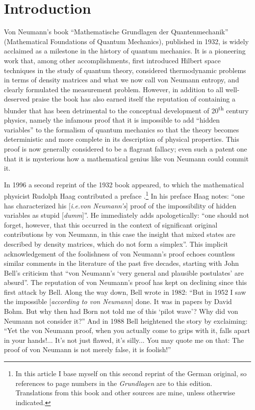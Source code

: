 \documentclass[12pt]{article}
\begin{document}
\section{Introduction}\label{intro}

Von Neumann's book ``Mathematische Grundlagen der Quantenmechanik''  (Mathematical Foundations of Quantum Mechanics)\cite{VN1}, published in 1932, is widely acclaimed as a milestone in the history of quantum mechanics. It is a pioneering work that, among other accomplishments, first introduced Hilbert space techniques in the study of quantum theory, considered thermodynamic problems in terms of density matrices and what we now call von Neumann entropy, and clearly formulated the measurement problem. However, in addition to all well-deserved praise the book has also earned itself the reputation of containing a blunder that has been detrimental to the conceptual development of 20\textsuperscript{th} century physics, namely the infamous proof that it is impossible to add ``hidden variables'' to the formalism of quantum mechanics so that the theory becomes deterministic and more complete in its description of physical properties. This proof is now generally considered to be a flagrant fallacy; even such a patent one that it is mysterious how a mathematical genius like von Neumann could commit it.

In 1996 a second reprint of the 1932 book appeared, to which the mathematical physicist Rudolph Haag contributed a preface \cite{VN1}.\footnote{In this article I base myself on this second reprint of the German original, so references to page numbers in the \emph{Grundlagen} are to this edition. Translations from this book and other sources are mine, unless otherwise indicated.} In his preface Haag notes: ``one has characterized his [\emph{i.e.\@ von Neumann's}] proof of the impossibility of hidden variables as stupid [\emph{dumm}]''. He immediately adds apologetically: ``one should not forget, however, that this occurred in the context of significant original contributions by von Neumann, in this case the insight that mixed states are described by density matrices, which do not form a simplex''. This implicit acknowledgement of the foolishness of von Neumann's proof echoes countless similar comments in the literature of the past five decades, starting with John Bell's criticism \cite{bell66} that ``von Neumann's `very general and plausible postulates' are absurd''.  The reputation of von Neumann's proof has kept on declining since this first attack by Bell. Along the way down, Bell \cite{bell82} wrote in 1982: ``But in 1952 I saw the impossible [\emph{according to von Neumann}] done. It was in papers by David Bohm. But why then had Born not told me of this `pilot wave'? Why did von Neumann not consider it?''  And in 1988 Bell \cite{bell88} heightened the story by exclaiming: ``Yet the von Neumann proof, when you actually come to grips with it, falls apart in your hands!... It's not just flawed, it's silly... You may quote me on that: The proof of von Neumann is not merely false, it is foolish!''
\end{document}
